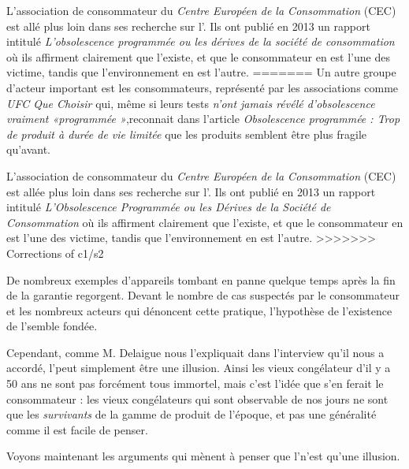 L'association de consommateur du \textit{Centre Européen de la Consommation} (CEC) est allé plus loin dans ses recherche sur l'\op. Ils ont publié en 2013 un rapport\cite{cec-zevRapportObsProg}  intitulé \textit{L'obsolescence programmée ou les dérives de la société de consommation} où ils affirment clairement que l'\op existe, et que le consommateur en est l'une des victime, tandis que l'environnement en est l'autre. 
=======
\medbreak
Un autre groupe d'acteur important est les consommateurs, représenté par les associations comme \textit{UFC Que Choisir} qui, même si leurs tests \textit{n'ont jamais révélé d’obsolescence vraiment «programmée »},reconnait dans l'article \textit{Obsolescence programmée : Trop de produit à durée de vie limitée } que les produits semblent être plus fragile qu'avant. %

L'association de consommateur du \textit{Centre Européen de la Consommation} (CEC) est allée plus loin dans ses recherche sur l'\op. Ils ont publié en 2013 un rapport intitulé \textit{L'Obsolescence Programmée ou les Dérives de la Société de Consommation} où ils affirment clairement que l'\op existe, et que le consommateur en est l'une des victime, tandis que l'environnement en est l'autre. 
>>>>>>> Corrections of c1/s2

\medbreak

De nombreux exemples d'appareils tombant en panne quelque temps après la fin de la garantie regorgent. Devant le nombre de cas suspectés par le consommateur et les nombreux acteurs qui dénoncent cette pratique, l'hypothèse de l'existence de l'\op semble fondée. 

\bigbreak
Cependant, comme M. Delaigue nous l'expliquait dans l'interview qu'il nous a accordé, l'\op peut simplement être une illusion. Ainsi les vieux congélateur d'il y a 50 ans ne sont pas forcément tous immortel, mais c'est l'idée que s'en ferait le consommateur : les vieux congélateurs qui sont observable de nos jours ne sont que les \textit{survivants } de la gamme de produit de l'époque, et pas une généralité comme il est facile de penser. 


Voyons maintenant les arguments qui mènent à penser que l'\op n'est qu'une illusion. 
